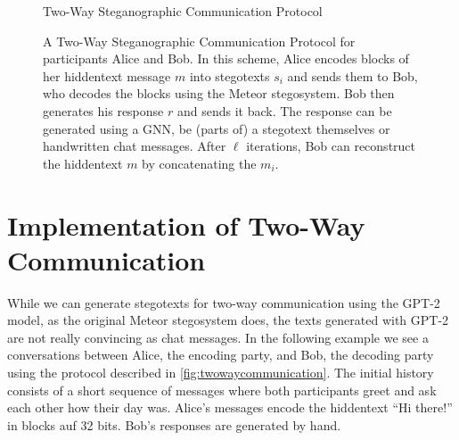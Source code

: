 \begin{figure}[htbp]
	\centering
	\begin{msc}[instance distance=4cm,action width=5cm]{Two-Way Steganographic Communication Protocol}
		\nextlevel[2]
		\nextlevel[3]
		\nextlevel[2]
		\nextlevel[3]
		\nextlevel
		\nextlevel[2]
		\nextlevel[3]
		\nextlevel
		\nextlevel[2]
		\nextlevel[3]
		\nextlevel
	\end{msc}
	\caption{
	A Two-Way Steganographic Communication Protocol for participants Alice and Bob.
	In this scheme, Alice encodes blocks of her hiddentext message $m$ into stegotexts $s_i$ and sends them to Bob, who decodes the blocks using the Meteor stegosystem.
	Bob then generates his response $r$ and sends it back.
	The response can be generated using a GNN, be (parts of) a stegotext themselves or handwritten chat messages.
	After $\ell$ iterations, Bob can reconstruct the hiddentext $m$ by concatenating the $m_i$.
	}
	\label{fig:twowaycommunication}
\end{figure}

\section{Implementation of Two-Way Communication}
While we can generate stegotexts for two-way communication using the GPT-2 model, as the original Meteor stegosystem does, the texts generated with GPT-2 are not really convincing as chat messages. 
In the following example we see a conversations between Alice, the encoding party, and Bob, the decoding party using the protocol described in \autoref{fig:twowaycommunication}.
The initial history consists of a short sequence of messages where both participants greet and ask each other how their day was.
Alice's messages encode the hiddentext ``Hi there!'' in blocks auf 32 bits. 
Bob's responses are generated by hand.

